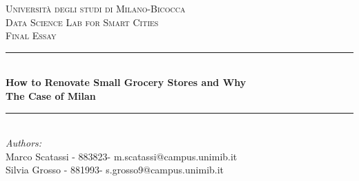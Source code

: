 \begin{titlepage}

\newcommand{\HRule}{\rule{\linewidth}{0.5mm}} %

\center %
 

\textsc{\LARGE Università degli studi di Milano-Bicocca}\\[1cm] %
\textsc{\Large Data Science Lab for Smart Cities}\\[0.3cm] %
\textsc{\large Final Essay}\\[0.1cm] %


\HRule \\[0.4cm]
{ \LARGE \bfseries How to Renovate Small Grocery Stores and Why}\\[0.3cm] %
{ \Large \bfseries The Case of Milan}\\[0.1cm] %
\HRule \\[1.5cm]
 

\large
\emph{Authors:}\\
Marco Scatassi - 883823- m.scatassi@campus.unimib.it \\   %
Silvia Grosso - 881993- s.grosso9@campus.unimib.it   \\[1cm] %



\end{titlepage}
